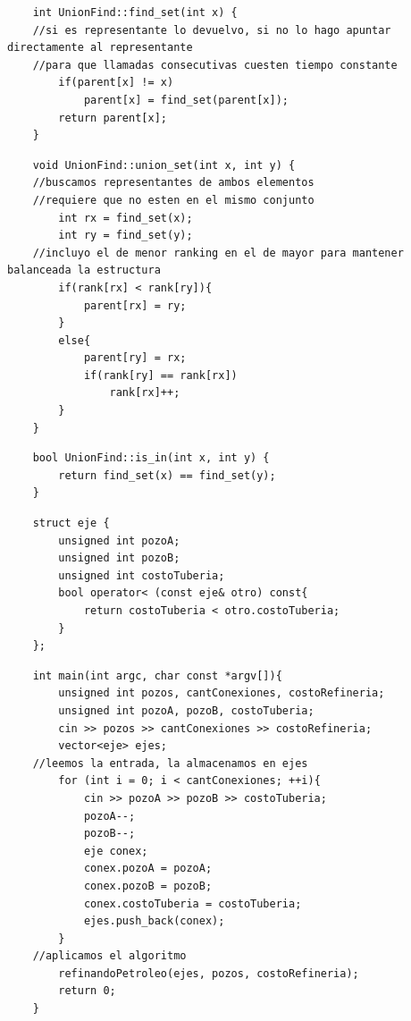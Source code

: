 	\begin{codesnippet}
	\begin{verbatim}
    int UnionFind::find_set(int x) {
    //si es representante lo devuelvo, si no lo hago apuntar directamente al representante
    //para que llamadas consecutivas cuesten tiempo constante
        if(parent[x] != x)
            parent[x] = find_set(parent[x]);
        return parent[x];
    }
	\end{verbatim}
	\end{codesnippet}

	\begin{codesnippet}
	\begin{verbatim}
    void UnionFind::union_set(int x, int y) {
    //buscamos representantes de ambos elementos
    //requiere que no esten en el mismo conjunto
        int rx = find_set(x);
        int ry = find_set(y);
    //incluyo el de menor ranking en el de mayor para mantener balanceada la estructura
        if(rank[rx] < rank[ry]){
            parent[rx] = ry;
        }
        else{
            parent[ry] = rx;
            if(rank[ry] == rank[rx])
                rank[rx]++;
        }
    }
	\end{verbatim}
	\end{codesnippet}

	\begin{codesnippet}
	\begin{verbatim}
    bool UnionFind::is_in(int x, int y) {
        return find_set(x) == find_set(y);
    }
	\end{verbatim}
	\end{codesnippet}

	\begin{codesnippet}
	\begin{verbatim}
    struct eje {
        unsigned int pozoA;
        unsigned int pozoB;
        unsigned int costoTuberia;
        bool operator< (const eje& otro) const{
            return costoTuberia < otro.costoTuberia;
        }
    };
	\end{verbatim}
	\end{codesnippet}

	\begin{codesnippet}
	\begin{verbatim}
    int main(int argc, char const *argv[]){
        unsigned int pozos, cantConexiones, costoRefineria;
        unsigned int pozoA, pozoB, costoTuberia;
        cin >> pozos >> cantConexiones >> costoRefineria;
        vector<eje> ejes;
    //leemos la entrada, la almacenamos en ejes
        for (int i = 0; i < cantConexiones; ++i){
            cin >> pozoA >> pozoB >> costoTuberia;
            pozoA--;
            pozoB--;
            eje conex;
            conex.pozoA = pozoA;
            conex.pozoB = pozoB;
            conex.costoTuberia = costoTuberia;
            ejes.push_back(conex);
        }
    //aplicamos el algoritmo
        refinandoPetroleo(ejes, pozos, costoRefineria);
        return 0;
    }
	\end{verbatim}
	\end{codesnippet}

